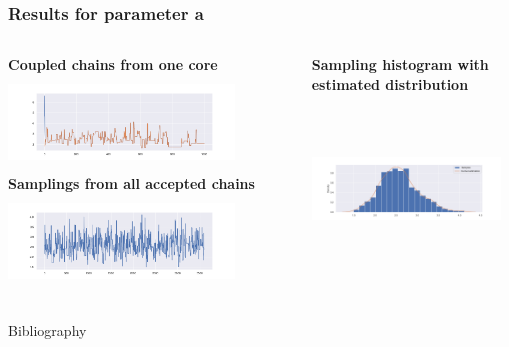 \documentclass{beamer}
\begin{document}
\begin{frame}
	\frametitle{Results for parameter a}
	\begin{columns}
		\begin{column}{0.4\textwidth}
			{\scriptsize \textbf{Coupled chains from one core}}\\
			\includegraphics[width=6cm,height=2.5cm]{doublecoupling_pack/doublecoupling_sigma_chain_meeting}
			\vspace{0.2cm}
			{	\scriptsize \textbf{Samplings from all accepted chains }}\\
			\includegraphics[width=6cm,height=2.5cm]{doublecoupling_pack/doublecoupling_sampling_sigma}
		\end{column}
		\begin{column}{0.4\textwidth}
			{\scriptsize \textbf{Sampling histogram with estimated distribution}}\\
			\includegraphics[width=5cm,height=5cm]{doublecoupling_pack/doublecoupling_sigma_histogram_kernel}
		\end{column}
	\end{columns}
	
\end{frame}
	\begin{frame}{Bibliography}
	\nocite{*}
	
	\tiny{  }
\end{frame}
\end{document}
